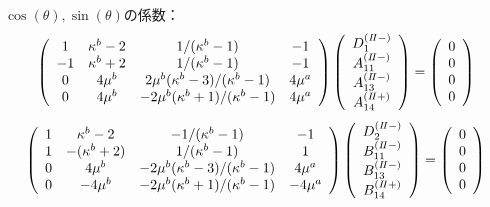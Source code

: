 $\cos(\theta),\sin(\theta)$の係数：
\begin{align}
	\left(
	\begin{array}{cccc}
		1& \kappa^b-2 & 1/(\kappa^b-1) & -1 \\
		-1 & \kappa^b+2 & 1/(\kappa^b-1) & -1 \\
		0 & 4\mu^{b} & 2\mu^{b}(\kappa^b-3)/(\kappa^b-1) & 4\mu^{a} \\
		0 & 4\mu^{b} & -2\mu^{b}(\kappa^b+1)/(\kappa^b-1) & 4\mu^{a} \\
	\end{array}
	\right)
	\left(
	\begin{array}{c}
		D_{1}^{(I\hspace{-.15em}I-)} \\
	 	A_{11}^{(I\hspace{-.15em}I-)} \\
		A_{13}^{(I\hspace{-.15em}I-)}\\
	 	A_{14}^{(I\hspace{-.15em}I+)} \\
	\end{array}
	\right)
	=
	\left(
	\begin{array}{c}
		0 \\
	 	0 \\
		0 \\
	 	0 \\
	\end{array}
	\right)
\end{align}
\begin{align}
	\left(
	\begin{array}{cccc}
		1& \kappa^b-2 & -1/(\kappa^b-1) & -1 \\
		1 & -(\kappa^b+2) & 1/(\kappa^b-1) & 1 \\
		0 & 4\mu^{b} & -2\mu^{b}(\kappa^b-3)/(\kappa^b-1) & 4\mu^{a} \\
		0 & -4\mu^{b} & -2\mu^{b}(\kappa^b+1)/(\kappa^b-1) & -4\mu^{a} \\
	\end{array}
	\right)
	\left(
	\begin{array}{c}
		D_{2}^{(I\hspace{-.15em}I-)} \\
	 	B_{11}^{(I\hspace{-.15em}I-)} \\
		B_{13}^{(I\hspace{-.15em}I-)} \\
	 	B_{14}^{(I\hspace{-.15em}I+)} \\
	\end{array}
	\right)
	=
	\left(
	\begin{array}{c}
		0 \\
	 	0 \\
		0 \\
	 	0 \\
	\end{array}
	\right)
\end{align}
\newpage

